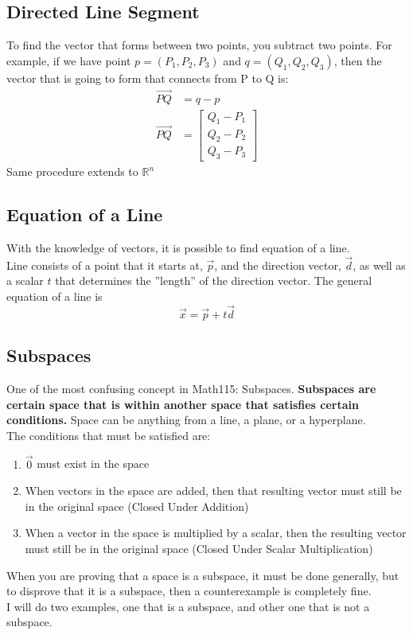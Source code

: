 \documentclass[12pt]{article}
\newcommand{\R}{\mathbb{R}}
\begin{document}
\subsection{Directed Line Segment}
To find the vector that forms between two points, you subtract two points. For example, if we have point $p = (P_1,P_2,P_3)$ and $q = (Q_1,Q_2,Q_3)$, then the vector that is going to form that connects from P to Q is: \\
\begin{equation}
\begin{split}
\vec{PQ} &= q - p\\
\vec{PQ} &= \begin{bmatrix}Q_1-P_1\\Q_2-P_2\\Q_3-P_3\end{bmatrix}
\end{split}
\end{equation}
Same procedure extends to $\R^n$

\subsection{Equation of a Line}
With the knowledge of vectors, it is possible to find equation of a line. \\
Line consists of a point that it starts at, $\vec{p}$, and the direction vector, $\vec{d}$, as well as a scalar $t$ that determines the ''length'' of the direction vector.
The general equation of a line is
\begin{equation}
\vec{x} = \vec{p} + t\vec{d}
\end{equation}

\subsection{Subspaces}
One of the most confusing concept in Math115: Subspaces. 
\textbf{Subspaces are certain space that is within another space that satisfies certain conditions.}
Space can be anything from a line, a plane, or a hyperplane. \\
The conditions that must be satisfied are:
\begin{enumerate}
  \item $\vec{0}$ must exist in the space
  \item When vectors in the space are added, then that resulting vector must still be in the original space (Closed Under Addition)
  \item When a vector in the space is multiplied by a scalar, then the resulting vector must still be in the original space (Closed Under Scalar Multiplication)
\end{enumerate}
When you are proving that a space is a subspace, it must be done generally, but to disprove that it is a subspace, then a counterexample is completely fine.\\
I will do two examples, one that is a subspace, and other one that is not a subspace.
\end{document}
